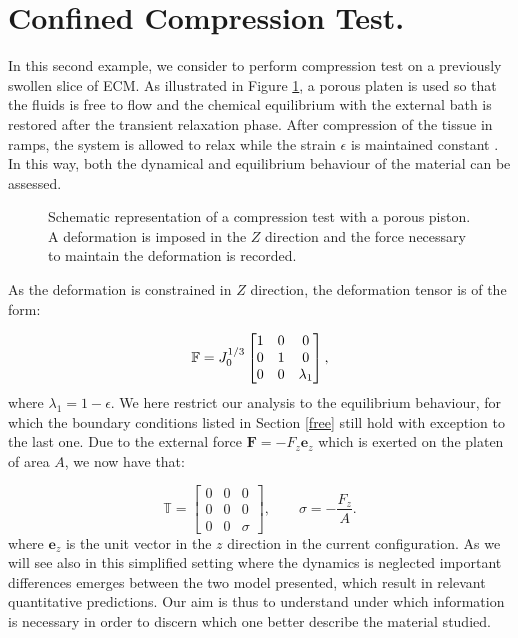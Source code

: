 \section{Confined Compression Test.}

In this second example, we consider to perform compression test on a previously swollen slice of ECM. As illustrated in Figure \ref{confcomp}, a porous platen is used so that the fluids is free to flow and the chemical equilibrium with the external bath is restored after the transient relaxation phase. After compression of the tissue in ramps, the system is allowed to relax while the strain $\epsilon$ is maintained constant \cite{Netti}. In this way, both the dynamical and equilibrium behaviour of the material can be assessed. 

\begin{figure}[h]
	\centering
	\def\svgwidth{0.89\linewidth}
	
	\vspace{2mm}
	\caption{Schematic representation of a compression test with a porous piston. A deformation is imposed in the $Z$ direction and the force necessary to maintain the deformation is recorded. }
	\label{confcomp}
\end{figure}

As the deformation is constrained in $Z$ direction, the deformation tensor is of the form:

\begin{equation}
\mathbb{F}=J_0^{1/3}\begin{bmatrix}
1 &0&0\\
0&1&0\\
0&0& \lambda_1
\end{bmatrix},
\label{F} 
\end{equation}
where $\lambda_1 = 1 - \epsilon$. We here restrict our analysis to the equilibrium behaviour, for which the boundary conditions listed in Section \ref{free} still hold with exception to the last one. Due to the external force $\mathbf{F}= -F_z \mathbf{e}_z$ which is exerted on the platen of area $A$, we now have that:

\begin{equation}
\mathbb{T}= \begin{bmatrix}
0 &0&0\\
0&0&0\\
0&0& \sigma
\end{bmatrix}, \qquad \sigma = -\frac{F_z}{A}.
\end{equation} 
where $\mathbf{e}_z$ is the unit vector in the $z$ direction in the current configuration. As we will see also in this simplified setting where the dynamics is neglected important differences emerges between the two model presented, which result in relevant quantitative predictions. Our aim is thus to understand under which information is necessary in order to discern which one better describe the material studied. 

